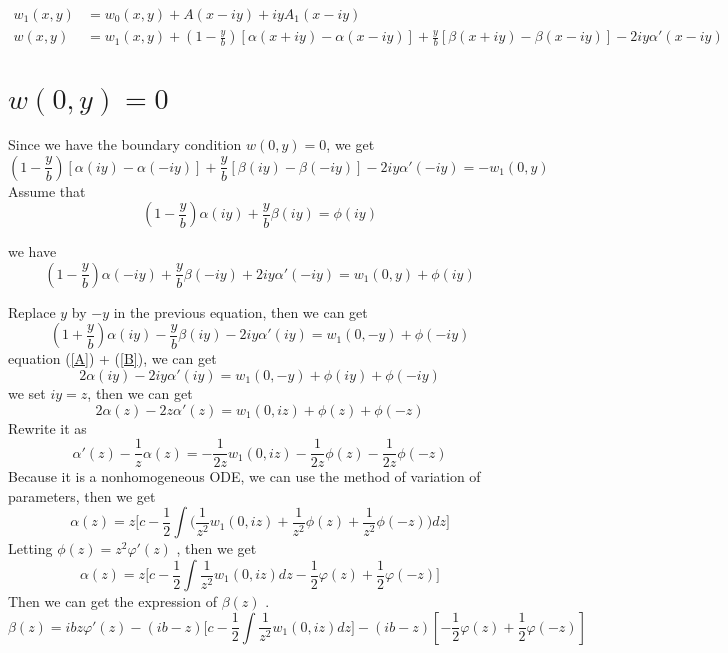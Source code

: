 \documentclass[a4paper]{article}      %
\begin{document}
\begin{equation}\label{K}
    \begin{split}
    w_1(x,y)&=w_0(x,y)+A(x-iy)+iyA_1(x-iy)\\
    w(x,y)&=w_1(x,y)+(1-\frac{y}{b})[\alpha(x+iy)-\alpha(x-iy)]+\frac{y}{b}[\beta(x+iy)-\beta(x-iy)]-2iy\alpha'(x-iy)
    \end{split}
\end{equation}
\section{$w(0,y)=0$}
Since  we have the boundary condition $w(0,y)=0$, we get
    \begin{equation} (1-\frac{y}{b})[\alpha(iy)-\alpha(-iy)]+\frac{y}{b}[\beta(iy)-\beta(-iy)]-2iy\alpha'(-iy)=-w_1(0,y)
    \end{equation}
Assume that
    \begin{equation}\label{A}
    (1-\frac{y}{b})\alpha(iy)+\frac{y}{b}\beta(iy)=\phi(iy)
    \end{equation}

we have
    \begin{equation}
    (1-\frac{y}{b})\alpha(-iy)+\frac{y}{b}\beta(-iy)+2iy\alpha'(-iy)=w_1(0,y)+\phi(iy)
    \end{equation}

Replace $y$ by $-y$ in the previous equation, then we can get
    \begin{equation}\label{B}
    (1+\frac{y}{b})\alpha(iy)-\frac{y}{b}\beta(iy)-2iy\alpha'(iy)=w_1(0,-y)+\phi(-iy)
    \end{equation}
equation (\ref{A}) + (\ref{B}), we can get
    \begin{equation}
    2\alpha(iy)-2iy\alpha'(iy)=w_1(0,-y)+\phi(iy)+\phi(-iy)
    \end{equation}
we set $iy=z$, then we can get
    \begin{equation}
    2\alpha(z)-2z\alpha'(z)=w_1(0,iz)+\phi(z)+\phi(-z)
    \end{equation}
Rewrite it as
    \begin{equation}
   \alpha'(z)-\frac{1}{z}\alpha(z)=-\frac{1}{2z}w_1(0,iz)-\frac{1}{2z}\phi(z)-\frac{1}{2z}\phi(-z)
    \end{equation}
Because it is a nonhomogeneous ODE, we can use the method of variation of parameters, then we get
    \begin{equation}
    \alpha(z)=z\bigg[c-\frac{1}{2}\int{\bigg(\frac{1}{z^2}w_1(0,iz)+\frac{1}{z^2}\phi(z)+\frac{1}{z^2}\phi(-z)\bigg)}dz\bigg]
    \end{equation}
Letting $\phi(z)=z^2 \varphi'(z)$ , then we get
    \begin{equation}\label{H}
    \alpha(z)=z\bigg[c-\frac{1}{2}\int{\frac{1}{z^2}w_1(0,iz)}dz-\frac{1}{2}\varphi(z)+\frac{1}{2}\varphi(-z)\bigg]
    \end{equation}
Then we can get the expression of $\beta(z)$ .
    \begin{equation}\label{I}
    \beta(z)=ibz\varphi'(z)-(ib-z)\big[c-\frac{1}{2}\int{\frac{1}{z^2}w_1(0,iz)}dz\big]-(ib-z)[-\frac{1}{2}\varphi(z)+\frac{1}{2}\varphi(-z)]
    \end{equation}
\end{document}
